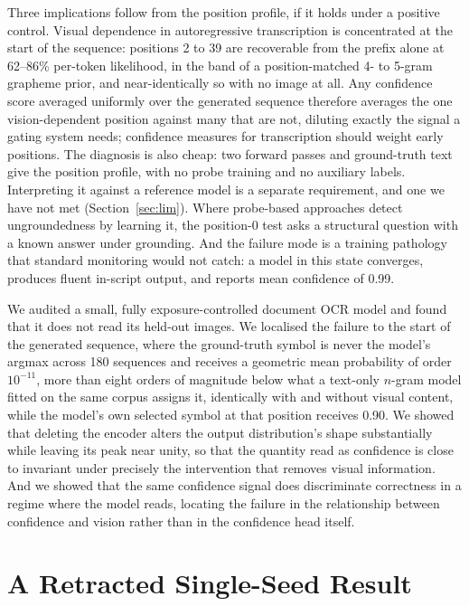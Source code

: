 \documentclass{article}
\begin{document}
Three implications follow from the position profile, if it holds under a positive control.
Visual dependence in autoregressive transcription is concentrated at the start of the
sequence: positions 2 to 39 are recoverable from the prefix alone at 62--86\% per-token
likelihood, in the band of a position-matched 4- to 5-gram grapheme prior, and near-identically
so with no image at all. Any confidence
score averaged uniformly over the generated sequence therefore averages the one
vision-dependent position against many that are not, diluting exactly the signal a gating
system needs; confidence measures for transcription should weight early positions. The
diagnosis is also cheap: two forward passes and ground-truth text give the position profile,
with no probe training and no auxiliary labels. Interpreting it against a reference model is a
separate requirement, and one we have not met (Section~\ref{sec:lim}). Where probe-based
approaches \citep{khanmohammadi2026bicr,yao2025abstain,kogilathota2026halp} detect
ungroundedness by learning it, the position-0 test asks a structural question with a known
answer under grounding. And the failure mode is a training pathology that standard monitoring
would not catch: a model in this state converges, produces fluent in-script output, and
reports mean confidence of 0.99.

We audited a small, fully exposure-controlled document OCR model and found that it does not
read its held-out images. We localised the failure to the start of the generated sequence,
where the ground-truth symbol is never the model's argmax across 180 sequences and receives a
geometric mean probability of order $10^{-11}$, more than eight orders of magnitude below what a
text-only $n$-gram model fitted on the same corpus assigns it, identically with and without
visual content, while the model's own selected symbol at that position receives 0.90. We showed that deleting the
encoder alters the output distribution's shape substantially while leaving its peak near
unity, so that the quantity read as confidence is close to invariant under precisely the
intervention that removes visual information. And we showed that the same confidence signal
does discriminate correctness in a regime where the model reads, locating the failure in the
relationship between confidence and vision rather than in the confidence head itself.




\appendix

\section{A Retracted Single-Seed Result}
\label{app:retraction}
\end{document}
